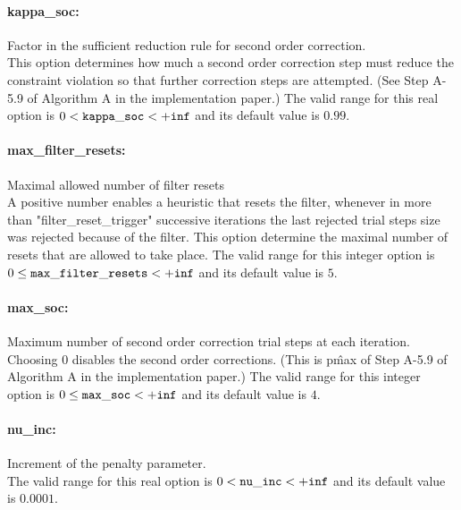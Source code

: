 \paragraph{kappa\_soc:}\label{sec:kappa_soc} Factor in the sufficient reduction rule for second order correction. $\;$ \\
 This option determines how much a second order
correction step must reduce the constraint
violation so that further correction steps are
attempted.  (See Step A-5.9 of Algorithm A in the
implementation paper.) The valid range for this real option is 
$0 <  {\tt kappa\_soc } <  {\tt +inf}$
and its default value is $0.99$.


\paragraph{max\_filter\_resets:}\label{sec:max_filter_resets} Maximal allowed number of filter resets $\;$ \\
 A positive number enables a heuristic that resets
the filter, whenever in more than
"filter\_reset\_trigger" successive iterations
the last rejected trial steps size was rejected
because of the filter.  This option determine the
maximal number of resets that are allowed to take
place. The valid range for this integer option is
$0 \le {\tt max\_filter\_resets } <  {\tt +inf}$
and its default value is $5$.


\paragraph{max\_soc:}\label{sec:max_soc} Maximum number of second order correction trial steps at each iteration. $\;$ \\
 Choosing 0 disables the second order corrections.
(This is p\^{max} of Step A-5.9 of Algorithm A in
the implementation paper.) The valid range for this integer option is
$0 \le {\tt max\_soc } <  {\tt +inf}$
and its default value is $4$.


\paragraph{nu\_inc:}\label{sec:nu_inc} Increment of the penalty parameter. $\;$ \\
 The valid range for this real option is 
$0 <  {\tt nu\_inc } <  {\tt +inf}$
and its default value is $0.0001$.


